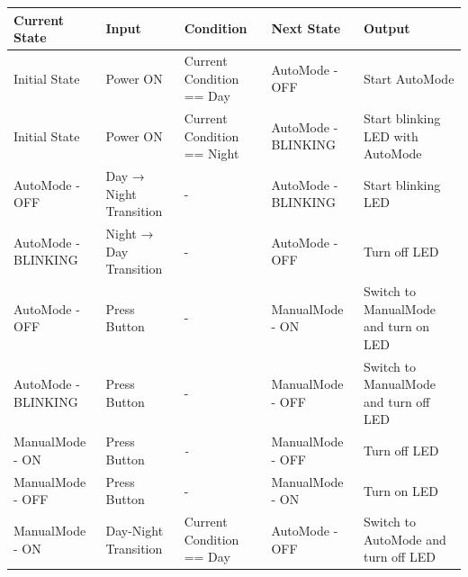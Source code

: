 {\begin{table}[H]
\begin{tabular}{|p{2.3cm}|p{3cm}|p{4cm}|p{2cm}|p{4cm}|}
\textbf{Current State} & \textbf{Input} & \textbf{Condition} & \textbf{Next State} & \textbf{Output} \\ \hline
{Initial State}                                & {Power ON}                            & {Current Condition == Day}                & {AutoMode - OFF}                           & Start AutoMode                            \\ \hline
{Initial State}                                & {Power ON}                            & {Current Condition == Night}              & {AutoMode - BLINKING}                      & Start blinking LED with AutoMode          \\ \hline
{AutoMode - OFF}                               & {Day → Night Transition}              & {-}                                       & {AutoMode - BLINKING}                      & Start blinking LED                        \\ \hline
{AutoMode - BLINKING}                          & {Night → Day Transition}              & {-}                                       & {AutoMode -  OFF}                          & Turn off LED                              \\ \hline
{AutoMode - OFF}                               & {Press Button}                        & {-}                                       & {ManualMode - ON}                          & Switch to ManualMode and turn on LED      \\ \hline
AutoMode - BLINKING                                                 & Press Button                                               & -                                                              & ManualMode - OFF                                                & Switch to ManualMode and turn off LED     \\ \hline
ManualMode - ON                                                     & Press Button                                               & \textit{-}                                                     & ManualMode - OFF                                                & Turn off LED                              \\ \hline
ManualMode - OFF                                                    & Press Button                                               & -                                                              & ManualMode - ON                                                 & Turn on LED                               \\ \hline
ManualMode - ON                                                     & Day-Night Transition                                       & Current Condition == Day                                       & AutoMode - OFF                                                  & Switch to AutoMode and turn off LED       \\ \hline

\end{tabular}
\end{table}}
